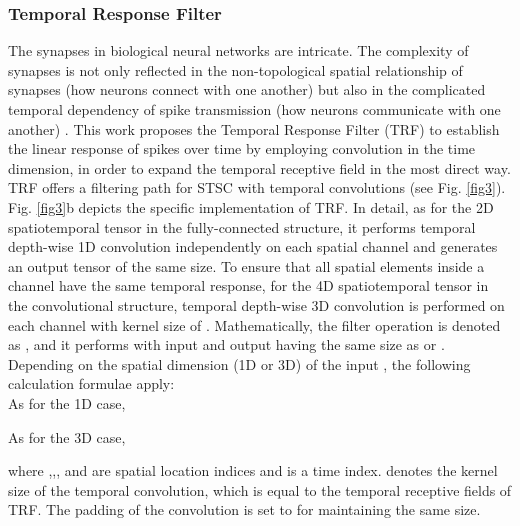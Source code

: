 \documentclass[letterpaper]{article} \usepackage[submission]{aaai23}  \usepackage{times}  \usepackage{helvet}  \usepackage{courier}  \usepackage[hyphens]{url}  \usepackage{graphicx} \urlstyle{rm} \def\UrlFont{\rm}  \usepackage{natbib}  \usepackage{caption} \frenchspacing  \setlength{\pdfpagewidth}{8.5in} \setlength{\pdfpageheight}{11in} \usepackage{algorithm}
\begin{document}
\subsubsection{Temporal Response Filter}
The synapses in biological neural networks are intricate. The complexity of synapses is not only reflected in the non-topological spatial relationship of synapses (how neurons connect with one another) but also in the complicated temporal dependency of spike transmission (how neurons communicate with one another) \cite{letellier_differential_2019}. 
This work proposes the Temporal Response Filter (TRF) to establish the linear response of spikes over time by employing convolution in the time dimension, in order to expand the temporal receptive field in the most direct way. TRF offers a filtering path for STSC with temporal convolutions (see Fig. \ref{fig3}). 
Fig. \ref{fig3}b depicts the specific implementation of TRF. In detail, as for the 2D spatiotemporal tensor in the fully-connected structure, it performs temporal depth-wise 1D convolution independently on each spatial channel and generates an output tensor of the same size. To ensure that all spatial elements inside a channel have the same temporal response, for the 4D spatiotemporal tensor in the convolutional structure, temporal depth-wise 3D convolution is performed on each channel with kernel size of .
Mathematically, the filter operation is denoted as , and it performs  with input  and output  having the same size as  or .
Depending on the spatial dimension (1D or 3D) of the input , the following calculation formulae apply:\\
As for the 1D case,

As for the 3D case,

where ,,, and  are spatial location indices and  is a time index.  denotes the kernel size of the temporal convolution, which is equal to the temporal receptive fields of TRF. The padding of the convolution is set to  for maintaining the same size.
\end{document}
